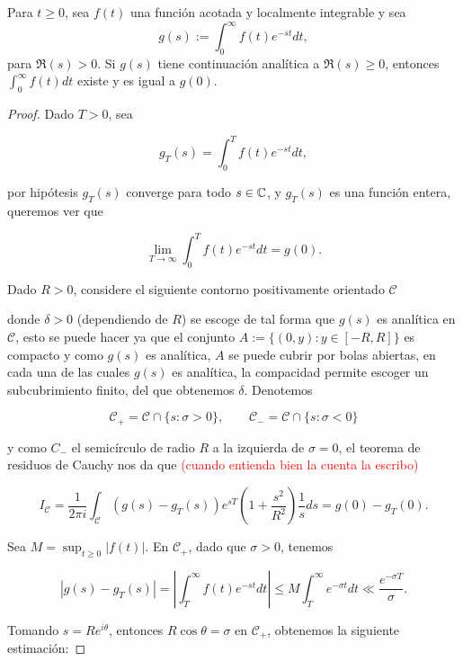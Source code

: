 \begin{theorem}
    Para $t \geq 0$, sea $f(t)$ una función acotada y localmente integrable y sea $$g(s):=\displaystyle\int_0^{\infty} f(t) e^{-s t} d t,$$
     para $\Re(s)>0$. Si $g(s)$ tiene continuación analítica a $\Re(s) \geq 0$, entonces $\displaystyle\int_0^{\infty} f(t) d t$ existe y es igual a $g(0)$.
\end{theorem}

\begin{proof}
    Dado $T>0$, sea

    $$g_T(s)=\int_0^Tf(t)e^{-st}dt,$$

    por hipótesis $g_T(s)$ converge para todo $s\in \mathbb{C}$, y $g_T(s)$ es una función entera, queremos ver que 

    $$\lim_{T \to \infty} \int_0^T f(t)e^{-st}dt=g(0).$$
 
    Dado $R>0$, considere el siguiente contorno positivamente orientado $\mathscr{C}$

    \begin{center}
    
    \end{center}

    donde $\delta>0$ (dependiendo de $R$) se escoge de tal forma que $g(s)$ es analítica en $\mathscr{C}$, esto se puede hacer ya que el conjunto $A:=\{(0,y): y\in [-R,R]\}$ es compacto y como $g(s)$ es analítica, $A$ se puede cubrir por bolas abiertas, en cada una de las cuales $g(s)$ es analítica, la compacidad permite escoger un subcubrimiento finito, del que obtenemos $\delta$.  Denotemos

    $$\mathscr{C}_+=\mathscr{C}\cap \{s:\sigma>0\},\quad \quad \mathscr{C}_-=\mathscr{C}\cap \{s:\sigma<0\}$$

    y como $C_-$ el semicírculo de radio $R$ a la izquierda de $\sigma=0$, el teorema de residuos de Cauchy nos da que \textcolor{red}{(cuando entienda bien la cuenta la escribo)}

    $$I_{\mathscr{C}}=\frac{1}{2\pi i}\int_{\mathscr{C}}\left(g(s)-g_T(s)\right)e^{sT}\left(1+\frac{s^2}{R^2}\right)\frac{1}{s}ds=g(0)-g_T(0).$$

    Sea $M = \sup _{t \geq 0}|f(t)|$. En $\mathscr{C}_{+}$, dado que $\sigma > 0$, tenemos

\[
\left|g(s)-g_T(s)\right| = \left|\int_T^{\infty} f(t) e^{-s t} d t\right| \leq M \int_T^{\infty} e^{-\sigma t} d t \ll \frac{e^{-\sigma T}}{\sigma}.
\]

Tomando $s = R e^{i \theta}$, entonces $R \cos \theta = \sigma$ en $\mathscr{C}_{+}$, obtenemos la siguiente estimación:


\end{proof}

